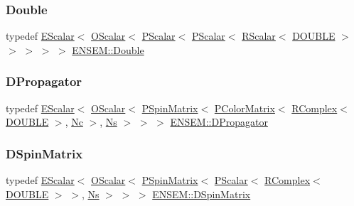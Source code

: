 \mbox{\label{group__defs_ga491906b5e5ffc41e1ec145d6ad29eb8b}} 
\subsubsection{\texorpdfstring{Double}{Double}}
{\footnotesize\ttfamily typedef \mbox{\hyperlink{classENSEM_1_1EScalar}{E\+Scalar}}$<$ \mbox{\hyperlink{classENSEM_1_1OScalar}{O\+Scalar}}$<$ \mbox{\hyperlink{classENSEM_1_1PScalar}{P\+Scalar}}$<$ \mbox{\hyperlink{classENSEM_1_1PScalar}{P\+Scalar}}$<$ \mbox{\hyperlink{classENSEM_1_1RScalar}{R\+Scalar}}$<$ \mbox{\hyperlink{namespaceENSEM_adcbd0de4e9e0e7ef6aa9b681a554e2c5}{D\+O\+U\+B\+LE}} $>$ $>$ $>$ $>$ $>$ \mbox{\hyperlink{group__defs_ga491906b5e5ffc41e1ec145d6ad29eb8b}{E\+N\+S\+E\+M\+::\+Double}}}

\mbox{\label{group__defs_ga4dacc58a6c2cf15e6072cd6fe4415a7c}} 
\subsubsection{\texorpdfstring{DPropagator}{DPropagator}}
{\footnotesize\ttfamily typedef \mbox{\hyperlink{classENSEM_1_1EScalar}{E\+Scalar}}$<$ \mbox{\hyperlink{classENSEM_1_1OScalar}{O\+Scalar}}$<$ \mbox{\hyperlink{classENSEM_1_1PSpinMatrix}{P\+Spin\+Matrix}}$<$ \mbox{\hyperlink{classENSEM_1_1PColorMatrix}{P\+Color\+Matrix}}$<$ \mbox{\hyperlink{classENSEM_1_1RComplex}{R\+Complex}}$<$ \mbox{\hyperlink{namespaceENSEM_adcbd0de4e9e0e7ef6aa9b681a554e2c5}{D\+O\+U\+B\+LE}} $>$, \mbox{\hyperlink{namespaceENSEM_aabe0c3018e0246aaae1602fa5c08b58a}{Nc}} $>$, \mbox{\hyperlink{namespaceENSEM_a6f05e048f9b2eb1a19131074f8abc25f}{Ns}} $>$ $>$ $>$ \mbox{\hyperlink{group__defs_ga4dacc58a6c2cf15e6072cd6fe4415a7c}{E\+N\+S\+E\+M\+::\+D\+Propagator}}}

\mbox{\label{group__defs_ga3d56e7ee2403fec93fff9b7d4cd7d7cf}} 
\subsubsection{\texorpdfstring{DSpinMatrix}{DSpinMatrix}}
{\footnotesize\ttfamily typedef \mbox{\hyperlink{classENSEM_1_1EScalar}{E\+Scalar}}$<$ \mbox{\hyperlink{classENSEM_1_1OScalar}{O\+Scalar}}$<$ \mbox{\hyperlink{classENSEM_1_1PSpinMatrix}{P\+Spin\+Matrix}}$<$ \mbox{\hyperlink{classENSEM_1_1PScalar}{P\+Scalar}}$<$ \mbox{\hyperlink{classENSEM_1_1RComplex}{R\+Complex}}$<$ \mbox{\hyperlink{namespaceENSEM_adcbd0de4e9e0e7ef6aa9b681a554e2c5}{D\+O\+U\+B\+LE}} $>$ $>$, \mbox{\hyperlink{namespaceENSEM_a6f05e048f9b2eb1a19131074f8abc25f}{Ns}} $>$ $>$ $>$ \mbox{\hyperlink{group__defs_ga3d56e7ee2403fec93fff9b7d4cd7d7cf}{E\+N\+S\+E\+M\+::\+D\+Spin\+Matrix}}}

